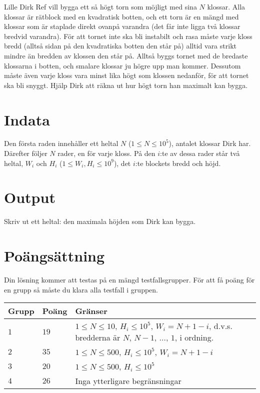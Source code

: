 Lille Dirk Ref vill bygga ett så högt torn som möjligt med sina $N$ klossar. Alla klossar är rätblock med en kvadratisk botten,
och ett torn är en mängd med klossar som är staplade direkt ovanpå varandra (det får inte ligga två klossar bredvid varandra).
För att tornet inte ska bli instabilt och rasa måste varje kloss bredd (alltså sidan på den kvadratiska botten den står på)
alltid vara strikt mindre än bredden av klossen den står på. Alltså byggs tornet med de bredaste klossarna i botten, och smalare
klossar ju högre upp man kommer. Dessutom måste även varje kloss vara minst lika högt som klossen nedanför, för att tornet ska bli snyggt.
Hjälp Dirk att räkna ut hur högt torn han maximalt kan bygga.

\section*{Indata}
Den första raden innehåller ett heltal $N$ ($1 \leq N \leq 10^5$), antalet klossar Dirk har.
Därefter följer $N$ rader, en för varje kloss. På den $i$:te av dessa rader står två heltal, $W_i$ och $H_i$ ($1 \leq W_i, H_i \leq 10^9$),
det $i$:te blockets bredd och höjd.

\section*{Output}
Skriv ut ett heltal: den maximala höjden som Dirk kan bygga.

\section*{Poängsättning}
Din lösning kommer att testas på en mängd testfallsgrupper. För att få poäng för en grupp så måste du klara alla testfall i gruppen.


\noindent
\begin{tabular}{| l | l | p{12cm} |}
  \hline
  \textbf{Grupp} & \textbf{Poäng} & \textbf{Gränser} \\ \hline
  $1$    & $19$      & $1 \leq N \leq 10$, $H_i \le 10^5$, $W_i = N+1 - i$, d.v.s. bredderna är $N$, $N-1$, $\dots$, $1$, i ordning. \\ \hline
  $2$    & $35$      & $1 \leq N \leq 500$, $H_i \le 10^5$, $W_i = N+1 - i$ \\ \hline
  $3$    & $20$      & $1 \leq N \leq 500$, $H_i \le 10^5$ \\ \hline
  $4$    & $26$      & Inga ytterligare begränsningar  \\ \hline
\end{tabular}


